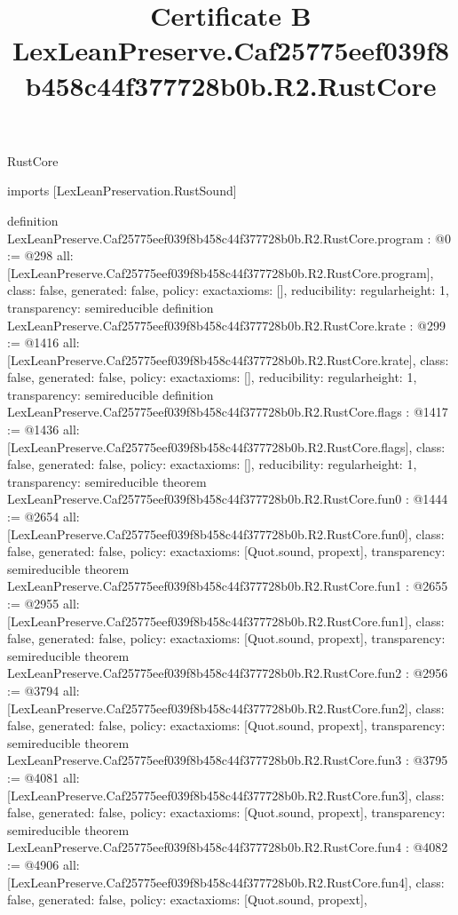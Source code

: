 \begin{lexlean}{RustCore}
\title{Certificate B LexLeanPreserve.Caf25775eef039f8b458c44f377728b0b.R2.RustCore}
\begin{coremodule}
imports [LexLeanPreservation.RustSound]

definition LexLeanPreserve.Caf25775eef039f8b458c44f377728b0b.R2.RustCore.program : @0 := @298 {
  all: [LexLeanPreserve.Caf25775eef039f8b458c44f377728b0b.R2.RustCore.program],
  class: false,
  generated: false,
  policy: exact{axioms: []},
  reducibility: regular{height: 1},
  transparency: semireducible
}
definition LexLeanPreserve.Caf25775eef039f8b458c44f377728b0b.R2.RustCore.krate : @299 := @1416 {
  all: [LexLeanPreserve.Caf25775eef039f8b458c44f377728b0b.R2.RustCore.krate],
  class: false,
  generated: false,
  policy: exact{axioms: []},
  reducibility: regular{height: 1},
  transparency: semireducible
}
definition LexLeanPreserve.Caf25775eef039f8b458c44f377728b0b.R2.RustCore.flags : @1417 := @1436 {
  all: [LexLeanPreserve.Caf25775eef039f8b458c44f377728b0b.R2.RustCore.flags],
  class: false,
  generated: false,
  policy: exact{axioms: []},
  reducibility: regular{height: 1},
  transparency: semireducible
}
theorem LexLeanPreserve.Caf25775eef039f8b458c44f377728b0b.R2.RustCore.fun0 : @1444 := @2654 {
  all: [LexLeanPreserve.Caf25775eef039f8b458c44f377728b0b.R2.RustCore.fun0],
  class: false,
  generated: false,
  policy: exact{axioms: [Quot.sound, propext]},
  transparency: semireducible
}
theorem LexLeanPreserve.Caf25775eef039f8b458c44f377728b0b.R2.RustCore.fun1 : @2655 := @2955 {
  all: [LexLeanPreserve.Caf25775eef039f8b458c44f377728b0b.R2.RustCore.fun1],
  class: false,
  generated: false,
  policy: exact{axioms: [Quot.sound, propext]},
  transparency: semireducible
}
theorem LexLeanPreserve.Caf25775eef039f8b458c44f377728b0b.R2.RustCore.fun2 : @2956 := @3794 {
  all: [LexLeanPreserve.Caf25775eef039f8b458c44f377728b0b.R2.RustCore.fun2],
  class: false,
  generated: false,
  policy: exact{axioms: [Quot.sound, propext]},
  transparency: semireducible
}
theorem LexLeanPreserve.Caf25775eef039f8b458c44f377728b0b.R2.RustCore.fun3 : @3795 := @4081 {
  all: [LexLeanPreserve.Caf25775eef039f8b458c44f377728b0b.R2.RustCore.fun3],
  class: false,
  generated: false,
  policy: exact{axioms: [Quot.sound, propext]},
  transparency: semireducible
}
theorem LexLeanPreserve.Caf25775eef039f8b458c44f377728b0b.R2.RustCore.fun4 : @4082 := @4906 {
  all: [LexLeanPreserve.Caf25775eef039f8b458c44f377728b0b.R2.RustCore.fun4],
  class: false,
  generated: false,
  policy: exact{axioms: [Quot.sound, propext]},
}
\end{coremodule}
\end{lexlean}
